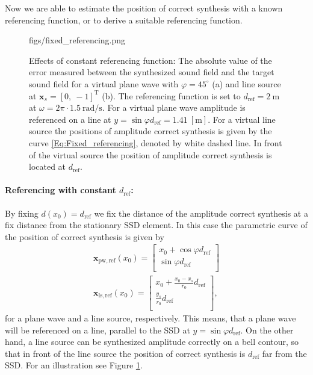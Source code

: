 \documentclass[12pt,a4paper]{article}
\newcommand{\sinfi}{\sin\varphi}
\newcommand{\cosfi}{\cos\varphi}
\newcommand{\dref}{d_{\mathrm{ref}}}
\begin{document}
Now we are able to estimate the position of correct synthesis with a known referencing function, or to derive a suitable referencing function.

\begin{figure}
	\centering
	\begin{overpic}[width = 1\columnwidth ]{figs/fixed_referencing.png}
	\scriptsize
	\end{overpic}
\caption{ Effects of constant referencing function: The absolute value of the error measured between the synthesized sound field and the target sound field for a virtual plane wave with $\varphi = 45^{\circ}$ (a) and line source at $\mathbf{x}_s = [0,\ -1]^{\mathrm{T}}$ (b). The referencing function is set to $\dref = 2~\mathrm{m}$ at $\omega = 2\pi\cdot 1.5~\mathrm{rad/s}$. For a virtual plane wave amplitude is referenced on a line at $y = \sinfi \dref = 1.41~[\mathrm{m}]$. For a virtual line source the positions of amplitude correct synthesis is given by the curve \eqref{Eq:Fixed_referencing}, denoted by white dashed line. In front of the virtual source the position of amplitude correct synthesis is located at $\dref$. }
	\label{Fig:Theory:fixed_referencing}
\end{figure}
\paragraph{Referencing with constant $\dref$:\\}
By fixing $d(x_0) = \dref$ we fix the distance of the amplitude correct synthesis at a fix distance from the stationary SSD element. In this case the parametric curve of the position of correct synthesis is given by
\begin{eqnarray}
\mathbf{x}_{\mathrm{pw, ref}}(x_0) =  \begin{bmatrix} x_0 + \cosfi \dref \\[0.3em] \sinfi \dref \\[0.3em]    \end{bmatrix} \\
\mathbf{x}_{\mathrm{ls, ref}}(x_0) =  \begin{bmatrix} x_0 + \frac{x_0-x_s}{r_0} \dref \\[0.3em] \frac{y_s}{r_0} \dref \\[0.3em]    \end{bmatrix},
\label{Eq:Fixed_referencing}
\end{eqnarray}
for a plane wave and a line source, respectively. This means, that a plane wave will be referenced on a line, parallel to the SSD at $y = \sinfi \dref$. On the other hand, a line source can be synthesized amplitude correctly on a bell contour, so that in front of the line source the position of correct synthesis is $\dref$ far from the SSD. For an illustration see Figure \ref{Fig:Theory:fixed_referencing}.
\end{document}

